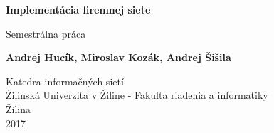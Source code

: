 \begin{titlepage}
    \begin{center}
        \vspace*{1cm}
        
        \Huge
        \textbf{Implementácia firemnej siete}
        
        \vspace{0.5cm}
        \LARGE
        Semestrálna práca
        
        \vspace{1.5cm}
        
	\Large
        \textbf{Andrej Hucík, Miroslav Kozák, Andrej Šišila}
        
        \vfill 
        
        \vspace{0.8cm}  
        
        \Large
        Katedra informačných sietí\\
        Žilinská Univerzita v Žiline - Fakulta riadenia a informatiky\\
        Žilina\\
        2017
        
    \end{center}
\end{titlepage}
